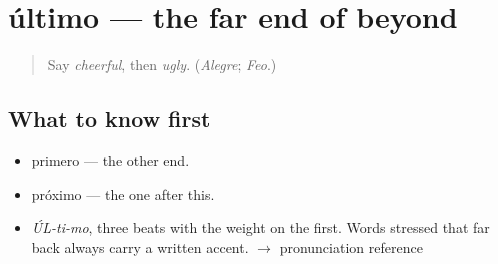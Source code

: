 \section[último]{último — the far end of beyond}

\label{lesson:ES-C380-ultimo}



\begin{quote}
Say \emph{cheerful}, then \emph{ugly}. (\emph{Alegre}; \emph{Feo}.)
\end{quote}

\subsection*{What to know first}
\begin{itemize}
\raggedright
  \item primero — the other end.
  \item próximo — the one after this.
\end{itemize}

\begin{sounds}
\begin{itemize}
\raggedright
  \item \emph{ÚL-ti-mo}, three beats with the weight on the first. Words stressed that far back always carry a written accent. $\to$ pronunciation reference
\end{itemize}
\end{sounds}

